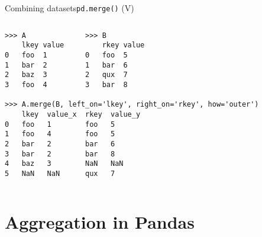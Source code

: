 \documentclass[10pt,compress]{beamer} %
\begin{document}
\begin{frame}[fragile]{Combining datasets}{\texttt{pd.merge()} (V)}
	\begin{columns}
    \column{\textwidth}
	\begin{exampleblock}{}
	\vspace{-0.2cm} 
		\begin{lstlisting}
>>> A              >>> B
    lkey value         rkey value
0   foo  1         0   foo  5
1   bar  2         1   bar  6
2   baz  3         2   qux  7
3   foo  4         3   bar  8

>>> A.merge(B, left_on='lkey', right_on='rkey', how='outer')
    lkey  value_x  rkey  value_y
0   foo   1        foo   5
1   foo   4        foo   5
2   bar   2        bar   6
3   bar   2        bar   8
4   baz   3        NaN   NaN
5   NaN   NaN      qux   7
\end{lstlisting}
		\vspace{-0.2cm} 
	\end{exampleblock}
	\end{columns}
\end{frame}

\section{Aggregation in Pandas}
\end{document}
